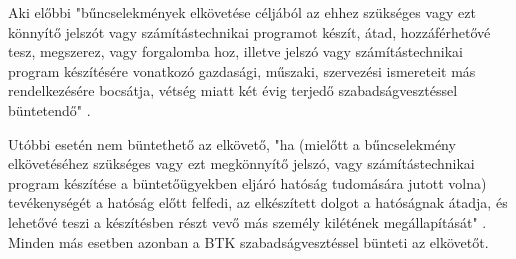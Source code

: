 Aki előbbi "bűncselekmények elkövetése céljából az ehhez szükséges vagy ezt könnyítő jelszót vagy számítástechnikai programot készít, átad, hozzáférhetővé tesz, megszerez, vagy forgalomba hoz, illetve jelszó vagy számítástechnikai program készítésére vonatkozó gazdasági, műszaki, szervezési ismereteit más rendelkezésére bocsátja, vétség miatt két évig terjedő szabadságvesztéssel büntetendő" \cite{2012-C-torveny}.

Utóbbi esetén nem büntethető az elkövető, "ha (mielőtt a bűncselekmény elkövetéséhez szükséges vagy ezt megkönnyítő jelszó, vagy számítástechnikai program készítése a büntetőügyekben eljáró hatóság tudomására jutott volna) tevékenységét a hatóság előtt felfedi, az elkészített dolgot a hatóságnak átadja, és lehetővé teszi a készítésben részt vevő más személy kilétének megállapítását" \cite{2012-C-torveny}. Minden más esetben azonban a BTK szabadságvesztéssel bünteti az elkövetőt.